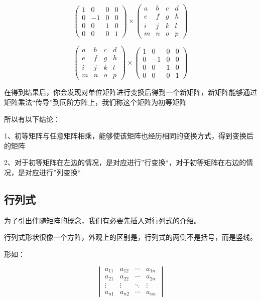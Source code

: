 \documentclass[12.8pt,a4paper,numbering = AMSalpha]{book}
\begin{document}
\[
\begin{pmatrix}
	1&0&0&0\\
	0&-1&0&0\\
	0&0&1&0\\
	0&0&0&1
\end{pmatrix}
\times
\begin{pmatrix}
	a&b&c&d\\
	e&f&g&h\\
	i&j&k&l\\
	m&n&o&p
\end{pmatrix}
\]

\[
\begin{pmatrix}
	a&b&c&d\\
	e&f&g&h\\
	i&j&k&l\\
	m&n&o&p
\end{pmatrix}
\times
\begin{pmatrix}
	1&0&0&0\\
	0&-1&0&0\\
	0&0&1&0\\
	0&0&0&1
\end{pmatrix}
\]

在得到结果后，你会发现对单位矩阵进行变换后得到一个新矩阵，新矩阵能够通过矩阵乘法“传导”到同阶方阵上，我们称这个矩阵为初等矩阵

所以有以下结论：

\vspace{10pt}

1、初等矩阵与任意矩阵相乘，能够使该矩阵也经历相同的变换方式，得到变换后的矩阵

2、对于初等矩阵在左边的情况，是对应进行”行变换“，对于初等矩阵在右边的情况，是对应进行”列变换“

\vspace{10pt}

\subsection{行列式}
为了引出伴随矩阵的概念，我们有必要先插入对行列式的介绍。

行列式形状很像一个方阵，外观上的区别是，行列式的两侧不是括号，而是竖线。

\vspace{10pt}
形如：

\[
\begin{vmatrix}
	a_{11} & a_{12} & \cdots & a_{1n}\\
	a_{21} & a_{22} & \cdots & a_{2n}\\
	\vdots & \vdots & \ddots & \vdots\\
	a_{n1} & a_{n2} & \cdots & a_{nn}
\end{vmatrix}
\]
\end{document}
